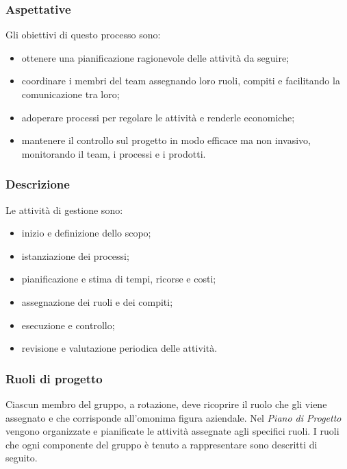 		\subsubsection{Aspettative}
		Gli obiettivi di questo processo sono:
		\begin{itemize}
			\item ottenere una pianificazione ragionevole delle attività da seguire;
			\item coordinare i membri del team assegnando loro ruoli, compiti e facilitando la comunicazione tra loro;
			\item adoperare processi per regolare le attività e renderle economiche;
			\item mantenere il controllo sul progetto in modo efficace ma non invasivo, monitorando il team, i processi e i prodotti.
		\end{itemize}
		\subsubsection{Descrizione}
		Le attività di gestione sono:
		\begin{itemize}
			\item inizio e definizione dello scopo;
			\item istanziazione dei processi;
			\item pianificazione e stima di tempi, ricorse e costi;
			\item assegnazione dei ruoli e dei compiti;
			\item esecuzione e controllo;
			\item revisione e valutazione periodica delle attività.
		\end{itemize}
		\subsubsection{Ruoli di progetto}
		Ciascun membro del gruppo, a rotazione, deve ricoprire il ruolo che gli viene assegnato e che corrisponde all'omonima figura aziendale. Nel \textit{Piano di Progetto} vengono organizzate e pianificate le attività assegnate agli specifici ruoli. I ruoli che ogni componente del gruppo è tenuto a rappresentare sono descritti di seguito.
